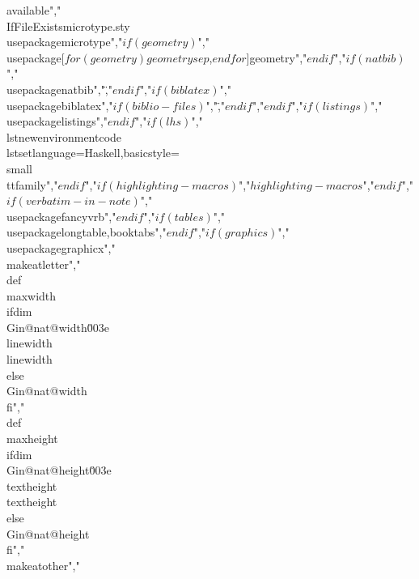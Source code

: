 available","\\IfFileExists{microtype.sty}{\\usepackage{microtype}}{}","$if(geometry)$","\\usepackage[$for(geometry)$$geometry$$sep$,$endfor$]{geometry}","$endif$","$if(natbib)$","\\usepackage{natbib}","\","$endif$","$if(biblatex)$","\\usepackage{biblatex}","$if(biblio-files)$","\","$endif$","$endif$","$if(listings)$","\\usepackage{listings}","$endif$","$if(lhs)$","\\lstnewenvironment{code}{\\lstset{language=Haskell,basicstyle=\\small\\ttfamily}}{}","$endif$","$if(highlighting-macros)$","$highlighting-macros$","$endif$","$if(verbatim-in-note)$","\\usepackage{fancyvrb}","$endif$","$if(tables)$","\\usepackage{longtable,booktabs}","$endif$","$if(graphics)$","\\usepackage{graphicx}","\\makeatletter","\\def\\maxwidth{\\ifdim\\Gin@nat@width\u003e\\linewidth\\linewidth\\else\\Gin@nat@width\\fi}","\\def\\maxheight{\\ifdim\\Gin@nat@height\u003e\\textheight\\textheight\\else\\Gin@nat@height\\fi}","\\makeatother","%